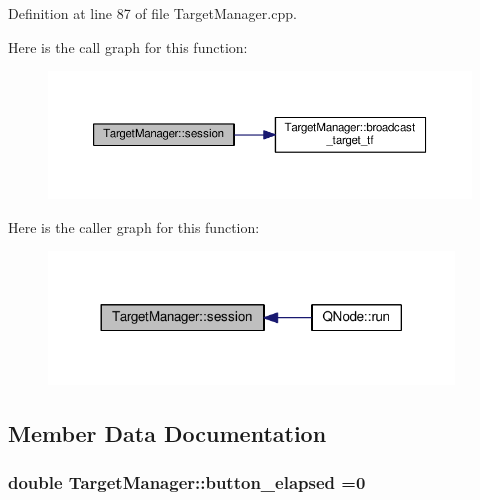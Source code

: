 Definition at line 87 of file Target\+Manager.\+cpp.



Here is the call graph for this function\+:
\nopagebreak
\begin{figure}[H]
\begin{center}
\leavevmode
\includegraphics[width=350pt]{class_target_manager_a4af88c70bb8a0af0171ee9a49536d5c0_cgraph}
\end{center}
\end{figure}




Here is the caller graph for this function\+:
\nopagebreak
\begin{figure}[H]
\begin{center}
\leavevmode
\includegraphics[width=305pt]{class_target_manager_a4af88c70bb8a0af0171ee9a49536d5c0_icgraph}
\end{center}
\end{figure}




\subsection{Member Data Documentation}
\subsubsection[{\texorpdfstring{button\+\_\+elapsed}{button_elapsed}}]{\setlength{\rightskip}{0pt plus 5cm}double Target\+Manager\+::button\+\_\+elapsed =0}\hypertarget{class_target_manager_ac60d6fea0aeb2e64da49bf0a9713b0b2}{}\label{class_target_manager_ac60d6fea0aeb2e64da49bf0a9713b0b2}


